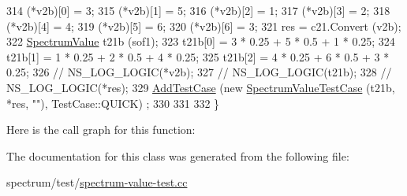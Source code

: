 \begin{DoxyCode}
314   (*v2b)[0] = 3;
315   (*v2b)[1] = 5;
316   (*v2b)[2] = 1;
317   (*v2b)[3] = 2;
318   (*v2b)[4] = 4;
319   (*v2b)[5] = 6;
320   (*v2b)[6] = 3;
321   res = c21.Convert (v2b);
322   \hyperlink{classns3_1_1SpectrumValue}{SpectrumValue} t21b (sof1);
323   t21b[0] = 3 * 0.25 + 5 * 0.5 + 1 * 0.25;
324   t21b[1] = 1 * 0.25 + 2 * 0.5 + 4 * 0.25;
325   t21b[2] = 4 * 0.25 + 6 * 0.5 + 3 * 0.25;
326 \textcolor{comment}{//   NS\_LOG\_LOGIC(*v2b);}
327 \textcolor{comment}{//   NS\_LOG\_LOGIC(t21b);}
328 \textcolor{comment}{//   NS\_LOG\_LOGIC(*res);}
329   \hyperlink{classns3_1_1TestCase_a3718088e3eefd5d6454569d2e0ddd835}{AddTestCase} (\textcolor{keyword}{new} \hyperlink{classSpectrumValueTestCase}{SpectrumValueTestCase} (t21b, *res, \textcolor{stringliteral}{""}), TestCase::QUICK)
      ;
330 
331 
332 \}
\end{DoxyCode}


Here is the call graph for this function\+:




The documentation for this class was generated from the following file\+:\begin{DoxyCompactItemize}
\item 
spectrum/test/\hyperlink{spectrum-value-test_8cc}{spectrum-\/value-\/test.\+cc}\end{DoxyCompactItemize}
